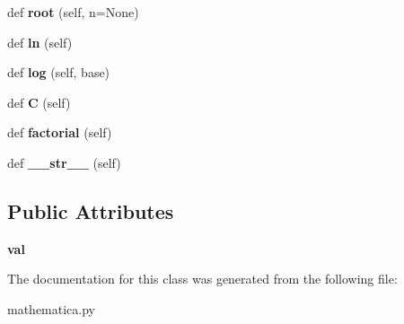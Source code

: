 \begin{DoxyCompactItemize}
\item 
\mbox{\label{classmathematica_1_1Math_aca43abeaa67d94ed9f5f0500e849fca7}} 
def {\bfseries root} (self, n=None)
\item 
\mbox{\label{classmathematica_1_1Math_ad508fed817a9937f20a50a62e11527cf}} 
def {\bfseries ln} (self)
\item 
\mbox{\label{classmathematica_1_1Math_af4c052e3cc91830400fa36ae77ac6689}} 
def {\bfseries log} (self, base)
\item 
\mbox{\label{classmathematica_1_1Math_ad1f31577c5abce1359cae41b55b8d511}} 
def {\bfseries C} (self)
\item 
\mbox{\label{classmathematica_1_1Math_aba40a3ccb2ee3f822c7991ed7d31f735}} 
def {\bfseries factorial} (self)
\item 
\mbox{\label{classmathematica_1_1Math_a1c76a2c9fc21baf56e29d7cb377d7b5b}} 
def {\bfseries \+\_\+\+\_\+str\+\_\+\+\_\+} (self)
\end{DoxyCompactItemize}
\subsection*{Public Attributes}
\begin{DoxyCompactItemize}
\item 
\mbox{\label{classmathematica_1_1Math_ab6bf34ee61a6992360d46a84efefa0a8}} 
{\bfseries val}
\end{DoxyCompactItemize}


The documentation for this class was generated from the following file\+:\begin{DoxyCompactItemize}
\item 
mathematica.\+py\end{DoxyCompactItemize}
